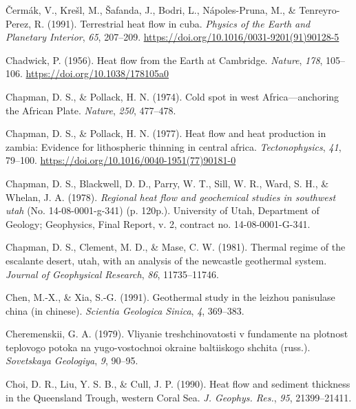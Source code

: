 \begin{CSLReferences}{1}{1}
\leavevmode{}%
Čermák, V., Krešl, M., Šafanda, J., Bodri, L., Nápoles-Pruna, M., \& Tenreyro-Perez, R. (1991). Terrestrial heat flow in cuba. \emph{Physics of the Earth and Planetary Interior}, \emph{65}, 207--209. \url{https://doi.org/10.1016/0031-9201(91)90128-5}

\leavevmode{}%
Chadwick, P. (1956). Heat flow from the {Earth} at {Cambridge}. \emph{Nature}, \emph{178}, 105--106. \url{https://doi.org/10.1038/178105a0}

\leavevmode{}%
Chapman, D. S., \& Pollack, H. N. (1974). Cold spot in west {Africa}---anchoring the {African Plate}. \emph{Nature}, \emph{250}, 477--478.

\leavevmode{}%
Chapman, D. S., \& Pollack, H. N. (1977). Heat flow and heat production in zambia: Evidence for lithospheric thinning in central africa. \emph{Tectonophysics}, \emph{41}, 79--100. \url{https://doi.org/10.1016/0040-1951(77)90181-0}

\leavevmode{}%
Chapman, D. S., Blackwell, D. D., Parry, W. T., Sill, W. R., Ward, S. H., \& Whelan, J. A. (1978). \emph{Regional heat flow and geochemical studies in southwest utah} (No. 14-08-0001-g-341) (p. 120p.). University of Utah, Department of Geology; Geophysics, Final Report, v. 2, contract no. 14-08-0001-G-341.

\leavevmode{}%
Chapman, D. S., Clement, M. D., \& Mase, C. W. (1981). Thermal regime of the escalante desert, utah, with an analysis of the newcastle geothermal system. \emph{Journal of Geophysical Research}, \emph{86}, 11735--11746.

\leavevmode{}%
Chen, M.-X., \& Xia, S.-G. (1991). Geothermal study in the leizhou panisulase china (in chinese). \emph{Scientia Geologica Sinica}, \emph{4}, 369--383.

\leavevmode{}%
Cheremenskii, G. A. (1979). Vliyanie treshchinovatosti v fundamente na plotnost teplovogo potoka na yugo-vostochnoi okraine baltiiskogo shchita (russ.). \emph{Sovetskaya Geologiya}, \emph{9}, 90--95.

\leavevmode{}%
Choi, D. R., Liu, Y. S. B., \& Cull, J. P. (1990). Heat flow and sediment thickness in the {Queensland Trough, western Coral Sea}. \emph{J. Geophys. Res.}, \emph{95}, 21399--21411.


\end{CSLReferences}
